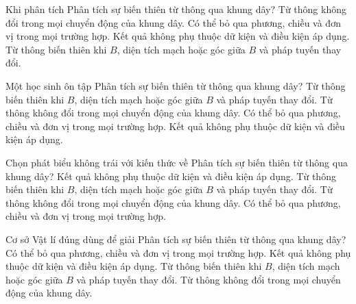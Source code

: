 \begin{ex}
Khi phân tích Phân tích sự biến thiên từ thông qua khung dây?
\choice
{Từ thông không đổi trong mọi chuyển động của khung dây.}
{Có thể bỏ qua phương, chiều và đơn vị trong mọi trường hợp.}
{Kết quả không phụ thuộc dữ kiện và điều kiện áp dụng.}
{\True Từ thông biến thiên khi $B$, diện tích mạch hoặc góc giữa $B$ và pháp tuyến thay đổi.}
\end{ex}

\begin{ex}
Một học sinh ôn tập Phân tích sự biến thiên từ thông qua khung dây?
\choice
{\True Từ thông biến thiên khi $B$, diện tích mạch hoặc góc giữa $B$ và pháp tuyến thay đổi.}
{Từ thông không đổi trong mọi chuyển động của khung dây.}
{Có thể bỏ qua phương, chiều và đơn vị trong mọi trường hợp.}
{Kết quả không phụ thuộc dữ kiện và điều kiện áp dụng.}
\end{ex}

\begin{ex}
Chọn phát biểu không trái với kiến thức về Phân tích sự biến thiên từ thông qua khung dây?
\choice
{Kết quả không phụ thuộc dữ kiện và điều kiện áp dụng.}
{\True Từ thông biến thiên khi $B$, diện tích mạch hoặc góc giữa $B$ và pháp tuyến thay đổi.}
{Từ thông không đổi trong mọi chuyển động của khung dây.}
{Có thể bỏ qua phương, chiều và đơn vị trong mọi trường hợp.}
\end{ex}

\begin{ex}
Cơ sở Vật lí đúng dùng để giải Phân tích sự biến thiên từ thông qua khung dây?
\choice
{Có thể bỏ qua phương, chiều và đơn vị trong mọi trường hợp.}
{Kết quả không phụ thuộc dữ kiện và điều kiện áp dụng.}
{\True Từ thông biến thiên khi $B$, diện tích mạch hoặc góc giữa $B$ và pháp tuyến thay đổi.}
{Từ thông không đổi trong mọi chuyển động của khung dây.}
\end{ex}

